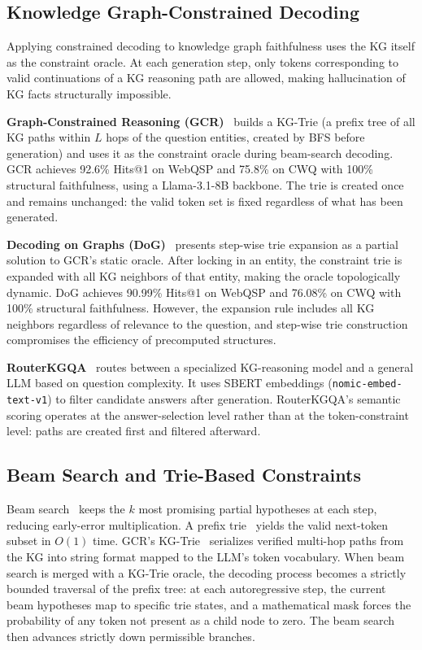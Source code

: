 \subsection{Knowledge Graph-Constrained Decoding}

Applying constrained decoding to knowledge graph faithfulness uses the KG itself as the constraint oracle. At each generation step, only tokens corresponding to valid continuations of a KG reasoning path are allowed, making hallucination of KG facts structurally impossible.

\textbf{Graph-Constrained Reasoning (GCR)}~\citep{luo2025-graph-constrained-reasoning} builds a KG-Trie (a prefix tree of all KG paths within $L$ hops of the question entities, created by BFS before generation) and uses it as the constraint oracle during beam-search decoding. GCR achieves 92.6\% Hits@1 on WebQSP and 75.8\% on CWQ with 100\% structural faithfulness, using a Llama-3.1-8B backbone. The trie is created once and remains unchanged: the valid token set is fixed regardless of what has been generated.

\textbf{Decoding on Graphs (DoG)}~\citep{li2024-decoding-on-graphs} presents step-wise trie expansion as a partial solution to GCR's static oracle. After locking in an entity, the constraint trie is expanded with all KG neighbors of that entity, making the oracle topologically dynamic. DoG achieves 90.99\% Hits@1 on WebQSP and 76.08\% on CWQ with 100\% structural faithfulness. However, the expansion rule includes all KG neighbors regardless of relevance to the question, and step-wise trie construction compromises the efficiency of precomputed structures.

\textbf{RouterKGQA}~\citep{yuan2026routerkgqa} routes between a specialized KG-reasoning model and a general LLM based on question complexity. It uses SBERT embeddings (\texttt{nomic-embed-text-v1}) to filter candidate answers after generation. RouterKGQA's semantic scoring operates at the answer-selection level rather than at the token-constraint level: paths are created first and filtered afterward.

\subsection{Beam Search and Trie-Based Constraints}

Beam search~\citep{lowerre1976harpy, holtzman2020curious} keeps the $k$ most promising partial hypotheses at each step, reducing early-error multiplication. A prefix trie~\citep{fredkin1960trie, willard2023outlines} yields the valid next-token subset in $O(1)$ time. GCR's KG-Trie~\citep{luo2025-graph-constrained-reasoning} serializes verified multi-hop paths from the KG into string format mapped to the LLM's token vocabulary. When beam search is merged with a KG-Trie oracle, the decoding process becomes a strictly bounded traversal of the prefix tree: at each autoregressive step, the current beam hypotheses map to specific trie states, and a mathematical mask forces the probability of any token not present as a child node to zero. The beam search then advances strictly down permissible branches.

